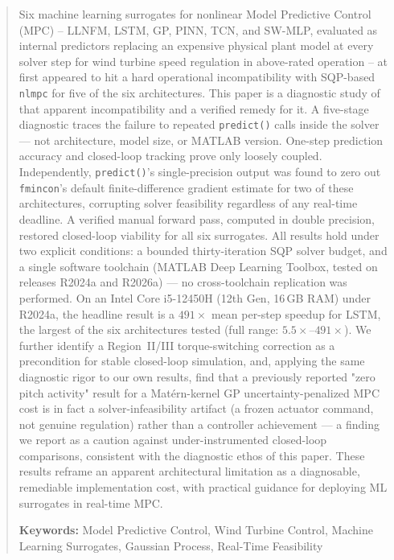 
\begin{abstract}
Six machine learning surrogates for nonlinear Model Predictive Control
(MPC) -- LLNFM, LSTM, GP, PINN, TCN, and SW-MLP, evaluated as internal
predictors replacing an expensive physical plant model at every solver
step for wind turbine speed regulation in above-rated operation -- at
first appeared to hit a hard operational incompatibility with
SQP-based \texttt{nlmpc} for five of the six architectures. This paper
is a diagnostic study of that apparent incompatibility and a verified
remedy for it. A five-stage diagnostic traces the failure to
repeated \texttt{predict()} calls inside the solver --- not
architecture, model size, or MATLAB version. One-step prediction
accuracy and closed-loop tracking prove only loosely coupled. Independently,
\texttt{predict()}'s single-precision output was found to zero out
\texttt{fmincon}'s default finite-difference gradient estimate for
two of these architectures, corrupting solver feasibility regardless
of any real-time deadline. A verified manual forward
pass, computed in double precision, restored closed-loop viability for
all six surrogates. All
results hold under two explicit conditions: a bounded
thirty-iteration SQP solver budget, and a single software toolchain
(MATLAB Deep Learning Toolbox, tested on releases R2024a and R2026a) ---
no cross-toolchain replication was performed. On an Intel Core
i5-12450H (12th Gen, 16\,GB RAM) under R2024a, the headline result is a
$491\times$ mean per-step speedup for LSTM, the largest of the six
architectures tested (full range: $5.5\times$--$491\times$). We further identify a
Region~II/III torque-switching correction as a precondition for stable
closed-loop simulation, and, applying the same diagnostic rigor to our
own results, find that a previously reported "zero pitch activity"
result for a Mat\'ern-kernel GP uncertainty-penalized MPC cost is in
fact a solver-infeasibility artifact (a frozen actuator command, not
genuine regulation) rather than a controller achievement --- a finding
we report as a caution against under-instrumented closed-loop
comparisons, consistent with the diagnostic ethos of this paper.
These results reframe an apparent architectural limitation as a
diagnosable, remediable implementation cost, with practical guidance
for deploying ML surrogates in real-time MPC.

\textbf{Keywords:} Model Predictive Control, Wind Turbine Control,
Machine Learning Surrogates, Gaussian Process, Real-Time Feasibility
\end{abstract}
